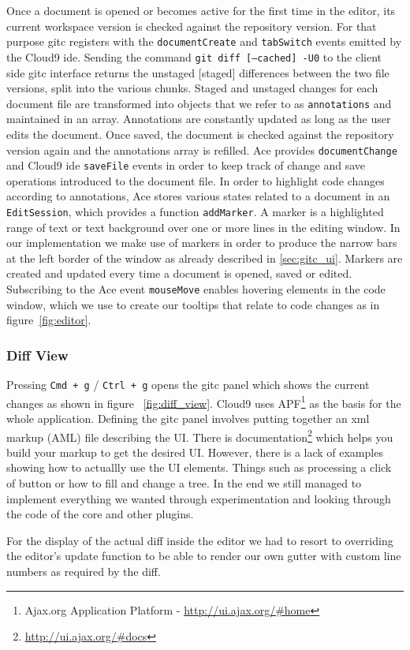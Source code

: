 Once a document is opened or becomes active for the first time in the editor, its current workspace version is checked against the repository version. 
For that purpose gitc registers with the \texttt{documentCreate} and \texttt{tabSwitch} events emitted by the Cloud9 ide. 
Sending the command \texttt{git diff [--cached] -U0} to the client side gitc interface returns the unstaged [staged] differences between the two file versions, split into the various chunks. 
Staged and unstaged changes for each document file are transformed into objects that we refer to as \texttt{annotations} and maintained in an array. Annotations are constantly updated as long as the user edits the document. 
Once saved, the document is checked against the repository version again and the annotations array is refilled. 
Ace provides \texttt{documentChange} and Cloud9 ide \texttt{saveFile} events in order to keep track of change and save operations introduced to the document file. 
In order to highlight code changes according to annotations, Ace stores various states related to a document in an \texttt{EditSession}, which provides a function \texttt{addMarker}. 
A marker is a highlighted range of text or text background over one or more lines in the editing window. 
In our implementation we make use of markers in order to produce the narrow bars at the left border of the window as already described in \ref{sec:gitc_ui}. 
Markers are created and updated every time a document is opened, saved or edited. 
Subscribing to the Ace event \texttt{mouseMove} enables hovering elements in the code window, which we use to create our tooltips that relate to code changes as in figure~\ref{fig:editor}.

\subsubsection{Diff View}

Pressing \texttt{Cmd + g} / \texttt{Ctrl + g} opens the gitc panel which shows the current changes as shown in figure ~\ref{fig:diff_view}.
Cloud9 uses APF\footnote{Ajax.org Application Platform - \url{http://ui.ajax.org/#home}} as the basis for the whole application.
Defining the gitc panel involves putting together an xml markup (AML) file describing the UI.
There is documentation\footnote{\url{http://ui.ajax.org/#docs}} which helps you build your markup to get the desired UI.
However, there is a lack of examples showing how to actuallly use the UI elements. Things such as processing a click of button
or how to fill and change a tree.
In the end we still managed to implement everything we wanted through experimentation and looking through the code of the core
and other plugins.

For the display of the actual diff inside the editor we had to resort to overriding the editor's update function to be able to
render our own gutter with custom line numbers as required by the diff.
